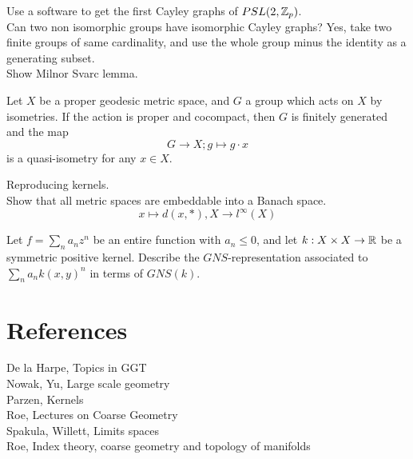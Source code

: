 Use a software to get the first Cayley graphs of $PSL(2,\mathbb Z_p)$.\\

Can two non isomorphic groups have isomorphic Cayley graphs? Yes, take two finite groups of same cardinality, and use the whole group minus the identity as a generating subset.\\

Show Milnor Svarc lemma.\\

\begin{thm}
Let $X$ be a proper geodesic metric space, and $G$ a group which acts on $X$ by isometries. If the action is proper and cocompact, then $G$ is finitely generated and the map
\[G \rightarrow X ; g\mapsto g\cdot x\]
is a quasi-isometry for any $x\in X$.
\end{thm}

Reproducing kernels.\\

Show that all metric spaces are embeddable into a Banach space. 
\[x\mapsto d(x, *), X\rightarrow l^\infty (X)\]

Let $f=\sum_n a_n z^n$ be an entire function with $a_n\leq 0$, and let $k: X\times X\rightarrow \mathbb R$ be a symmetric positive kernel. Describe the $GNS$-representation associated to $\sum_n a_n k(x,y)^n$ in terms of $GNS(k)$.

\section{References}

De la Harpe, Topics in GGT\\
Nowak, Yu, Large scale geometry\\
Parzen, Kernels\\
Roe, Lectures on Coarse Geometry\\
Spakula, Willett, Limits spaces\\
Roe, Index theory, coarse geometry and topology of manifolds\\
